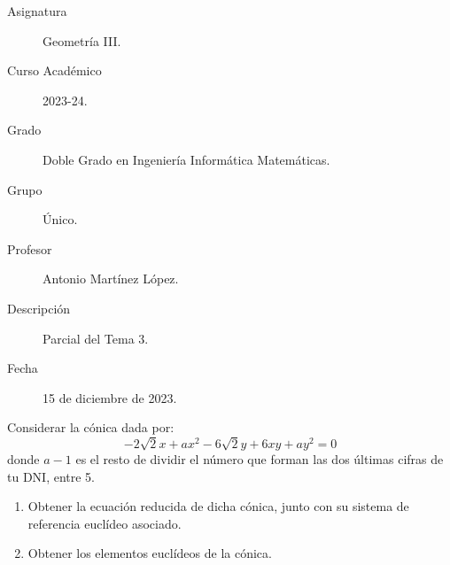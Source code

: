 \documentclass[12pt]{article}
\begin{document}

    
    

    \begin{description}
        \item[Asignatura] Geometría III.
        \item[Curso Académico] 2023-24.
        \item[Grado] Doble Grado en Ingeniería Informática Matemáticas.
        \item[Grupo] Único.
        \item[Profesor] Antonio Martínez López.
        \item[Descripción] Parcial del Tema 3.
        \item[Fecha] 15 de diciembre de 2023.
    
    \end{description}
    \newpage
    
    \begin{ejercicio}
        Considerar la cónica dada por:
        \begin{equation*}
            -2\sqrt{2}x + ax^2 -6\sqrt{2}y + 6xy + ay^2 = 0
        \end{equation*}
        donde $a-1$ es el resto de dividir el número que forman las dos últimas cifras de tu DNI, entre 5.
        \begin{enumerate}
            \item Obtener la ecuación reducida de dicha cónica, junto con su sistema de referencia euclídeo asociado.
            \item Obtener los elementos euclídeos de la cónica.
        \end{enumerate}
    \end{ejercicio}
\end{document}
